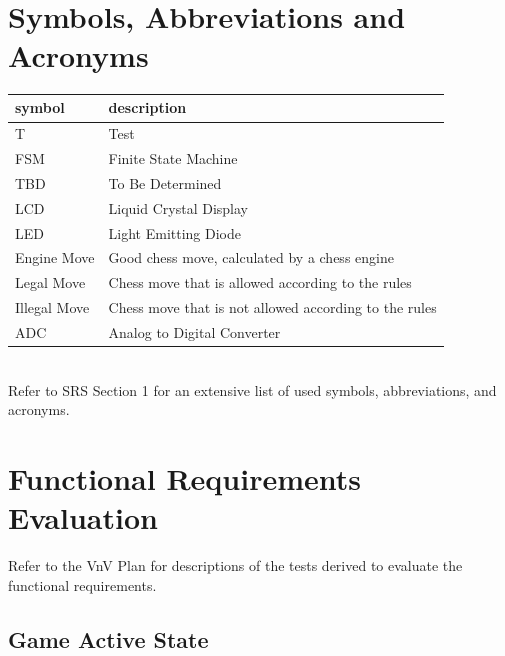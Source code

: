 \documentclass[12pt, titlepage]{article}
\begin{document}
~\newpage

\section{Symbols, Abbreviations and Acronyms}

\renewcommand{\arraystretch}{1.2}
\begin{tabular}{l l} 
    \toprule		
    \textbf{symbol} & \textbf{description}\\
    \midrule 
    T & Test\\
  FSM & Finite State Machine\\
    TBD & To Be Determined\\
    LCD & Liquid Crystal Display\\
    LED & Light Emitting Diode\\
    Engine Move & Good chess move, calculated by a chess engine\\
    Legal Move & Chess move that is allowed according to the rules\\
    Illegal Move & Chess move that is not allowed according to the rules\\
    ADC & Analog to Digital Converter\\
  \bottomrule
\end{tabular}\\

Refer to SRS Section 1 for an extensive list of used symbols, abbreviations, and acronyms.

\newpage

\tableofcontents

\listoftables %

\listoffigures %

\newpage


\section{Functional Requirements Evaluation}
Refer to the VnV Plan for descriptions of the tests derived to evaluate the functional requirements.
\subsection{Game Active State}
\end{document}
